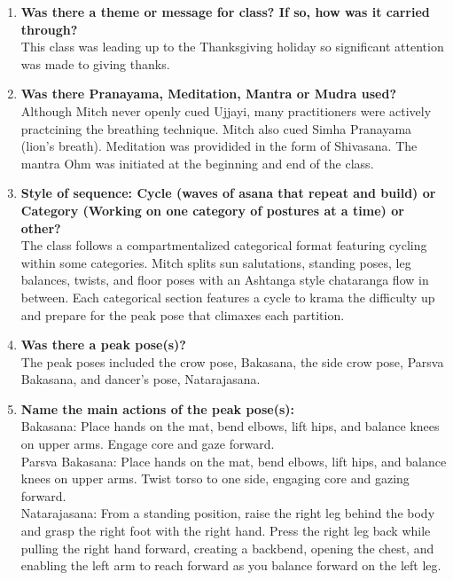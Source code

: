 \documentclass[10pt]{article}
\begin{document}
\begin{enumerate}
    \item \textbf{Was there a theme or message for class? If so, how was it carried through?}\\
    This class was leading up to the Thanksgiving holiday so significant attention was made to giving thanks. 

    \item \textbf{Was there Pranayama, Meditation, Mantra or Mudra used?}\\
    Although Mitch never openly cued Ujjayi, many practitioners were actively practcining the breathing technique. Mitch also cued Simha Pranayama (lion's breath). Meditation was providided in the form of Shivasana. The mantra Ohm was initiated at the beginning and end of the class. 

    \item \textbf{Style of sequence: Cycle (waves of asana that repeat and build) or Category (Working on one category of postures at a time) or other?}\\
    The class follows a compartmentalized categorical format featuring cycling within some categories. Mitch splits sun salutations, standing poses, leg balances, twists, and floor poses with an Ashtanga style chataranga flow in between. Each categorical section features a cycle to krama the difficulty up and prepare for the peak pose that climaxes each partition. 
    
    \item \textbf{Was there a peak pose(s)?}\\
    The peak poses included the crow pose, Bakasana, the side crow pose, Parsva Bakasana, and dancer's pose, Natarajasana. 

    \item \textbf{Name the main actions of the peak pose(s):}\\
    Bakasana: Place hands on the mat, bend elbows, lift hips, and balance knees on upper arms. Engage core and gaze forward.\\
    Parsva Bakasana: Place hands on the mat, bend elbows, lift hips, and balance knees on upper arms. Twist torso to one side, engaging core and gazing forward.\\
    Natarajasana: From a standing position, raise the right leg behind the body and grasp the right foot with the right hand. Press the right leg back while pulling the right hand forward, creating a backbend, opening the chest, and enabling the left arm to reach forward as you balance forward on the left leg. 


\end{enumerate}
\end{document}
